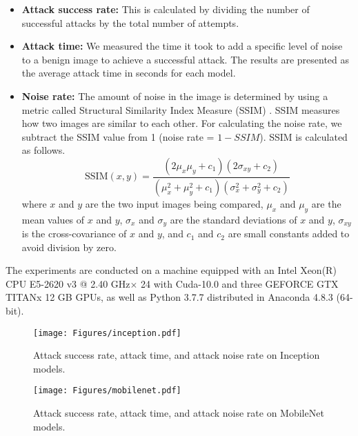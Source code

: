 \begin{itemize}[leftmargin=3ex]
    \item \textbf{Attack success rate:} This is calculated by dividing the number of successful attacks by the total number of attempts. 
    \item \textbf{Attack time:} We measured the time it took to add a specific level of noise to a benign image to achieve a successful attack. The results are presented as the average attack time in seconds for each model. 
    \item \textbf{Noise rate:} The amount of noise in the image is determined by using a metric called Structural Similarity Index Measure (SSIM) \cite{wang2004ssim}. SSIM measures how two images are similar to each other. For calculating the noise rate, we subtract the SSIM value from 1 (\ie noise rate = $1 - SSIM$). SSIM is calculated as follows.
    \begin{equation*}
    \label{eq:ssim}
    \text{SSIM}(x,y) = \frac{(2\mu_x\mu_y + c_1)(2\sigma_{xy} + c_2)}{(\mu_x^2+\mu_y^2+c_1)(\sigma_x^2+\sigma_y^2+c_2)}
    \end{equation*} 
    where  $x$ and $y$ are the two input images being compared, $\mu_x$ and $\mu_y$ are the mean values of $x$ and $y$, $\sigma_x$ and $\sigma_y$ are the standard deviations of $x$ and $y$, $\sigma_{xy}$ is the cross-covariance of $x$ and $y$, and $c_1$ and $c_2$ are small constants added to avoid division by zero.

\end{itemize}










 The experiments are conducted on a machine equipped with an Intel Xeon(R) CPU E5-2620 v3 @ 2.40 GHz$\times$ 24 with Cuda-10.0 and three GEFORCE GTX TITANx 12 GB GPUs, as well as Python 3.7.7 distributed in Anaconda 4.8.3 (64-bit). 
 




\begin{figure*}[ht]
    \centering
    \texttt{[image: Figures/inception.pdf]}
    \caption{Attack success rate, attack time, and attack noise rate on Inception models.}
    \label{fig:inception} 
\end{figure*}

\begin{figure*}[ht]
    \centering
    \texttt{[image: Figures/mobilenet.pdf]}
    \caption{Attack success rate, attack time, and attack noise rate on MobileNet models.}
    \label{fig:mobilenet} 
\end{figure*} 


